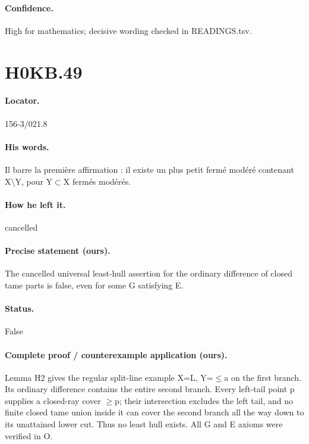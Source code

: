 \paragraph{Confidence.} High for mathematics; decisive wording checked in READINGS.tsv.

\section*{H0KB.49}\label{statement:H0KB.49}
\paragraph{Locator.} 156-3/021.8

\paragraph{His words.} Il barre la première affirmation : il existe un plus petit fermé modéré contenant X\textbackslash{}Y, pour Y\ensuremath{\subset}X fermés modérés.

\paragraph{How he left it.} cancelled

\paragraph{Precise statement (ours).} The cancelled universal least-hull assertion for the ordinary difference of closed tame parts is false, even for some G satisfying E.

\paragraph{Status.} False

\paragraph{Complete proof / counterexample application (ours).} Lemma H2 gives the regular split-line example X=L, Y=\ensuremath{\leq}a on the first branch. Its ordinary difference contains the entire second branch. Every left-tail point p supplies a closed-ray cover \ensuremath{\geq}p; their intersection excludes the left tail, and no finite closed tame union inside it can cover the second branch all the way down to its unattained lower cut. Thus no least hull exists. All G and E axioms were verified in O.

